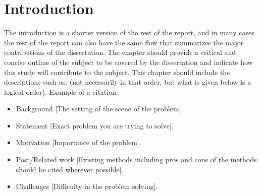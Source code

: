 \chapter{Introduction}

The introduction is a shorter version of the rest of the report, and in many cases the rest of the report can 
also have the same flow that summarizes the major contributions of the dissertation. The chapter should provide a 
critical and concise outline of the subject to be covered by the dissertation and indicate how this study will 
contribute to the subject. This chapter should include the descriptions such as: (not necessarily in that order, 
but what is given below is a logical order). Example of a citation: \cite{bar}
\begin{itemize}
	\item Background [The setting of the scene of the problem].
	\item Statement [Exact problem you are trying to solve]. 
	\item Motivation [Importance of the problem]. 
	\item Post/Related work [Existing methods including pros and cons of the methods should be cited wherever possible].
	\item Challenges [Difficulty in the problem solving].
\end{itemize}


